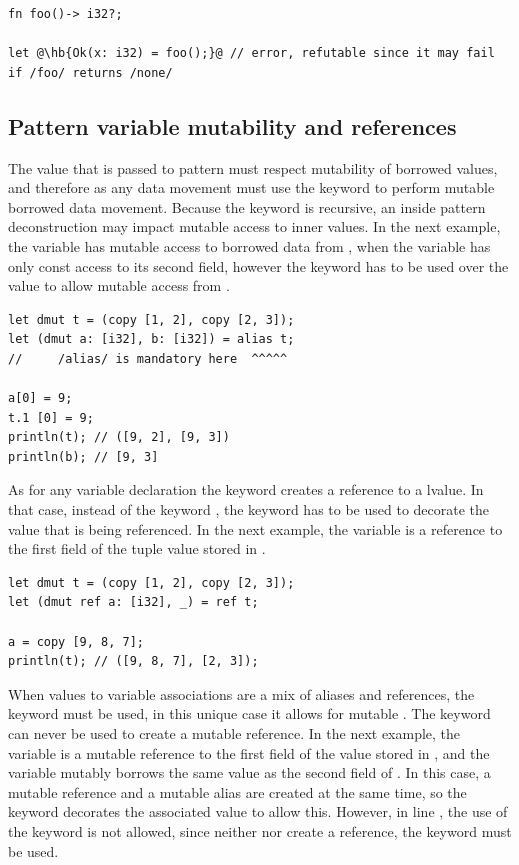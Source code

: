\begin{lstlisting}[style=coloredverbatimError, escapechar=@]
fn foo()-> i32?;

let @\hb{Ok(x: i32) = foo();}@ // error, refutable since it may fail if /foo/ returns /none/
\end{lstlisting}

\subsection{Pattern variable mutability and references}

The value that is passed to pattern must respect mutability of borrowed values,
and therefore as any data movement must use the keyword  to
perform mutable borrowed data movement. Because the keyword is recursive, an
inside pattern deconstruction may impact mutable access to inner values. In the
next example, the variable  has mutable access to borrowed data from
, when the variable  has only const access to its second
field, however the keyword  has to be used over the value
 to allow mutable access from .

\begin{lstlisting}[style=coloredverbatim, escapechar=@]
let dmut t = (copy [1, 2], copy [2, 3]);
let (dmut a: [i32], b: [i32]) = alias t;
//     /alias/ is mandatory here  ^^^^^

a[0] = 9;
t.1 [0] = 9;
println(t); // ([9, 2], [9, 3])
println(b); // [9, 3]
\end{lstlisting}

As for any variable declaration the keyword  creates a
reference to a lvalue. In that case, instead of the keyword , the
keyword \token{ref} has to be used to decorate the value that is being
referenced. In the next example, the variable \token{a} is a reference to the
first field of the tuple value stored in \token{t}.

\begin{lstlisting}[style=coloredverbatim, escapechar=@]
let dmut t = (copy [1, 2], copy [2, 3]);
let (dmut ref a: [i32], _) = ref t;

a = copy [9, 8, 7];
println(t); // ([9, 8, 7], [2, 3]);
\end{lstlisting}

When values to variable associations are a mix of aliases and references, the
keyword \token{ref} must be used, in this unique case it allows for mutable
. The \token{alias} keyword can never be used to create a mutable
reference. In the next example, the variable \token{a} is a mutable reference
to the first field of the value stored in , and the variable
\token{b} mutably borrows the same value as the second field of \token{t}. In
this case, a mutable reference and a mutable alias are created at the same time,
so the keyword  decorates the associated value to allow
this. However, in line \token{4}, the use of the keyword \token{ref} is not
allowed, since neither \token{c} nor \token{d} create a reference, the keyword
\token{alias} must be used.

